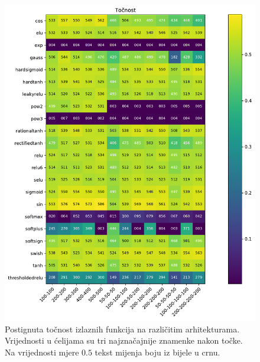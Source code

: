 \documentclass[times, utf8, numeric, diplomski]{fer}
\begin{document}
\begin{figure}[ht]
\includegraphics[width=\textwidth]{greedy_256_acc.pdf}
\centering
\caption{Postignuta točnost izlaznih funkcija na različitim arhitekturama. Vrijednosti u ćelijama su tri najznačajnije znamenke nakon točke. Na vrijednosti mjere $0.5$ tekst mijenja boju iz bijele u crnu.}
\label{fig:greedy_256_acc}
\end{figure}
\end{document}
